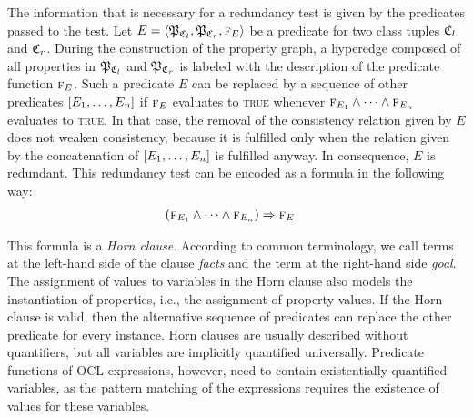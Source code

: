 The information that is necessary for a redundancy test is given by the predicates passed to the test.
Let $E = \tupled{\propertysettuple{P}{\classtuple{C}{l}}, \propertysettuple{P}{\classtuple{C}{r}}, \function{f}_E}$ be a predicate for two class tuples $\classtuple{C}{l}$ and $\classtuple{C}{r}$. 
During the construction of the property graph, a hyperedge composed of all properties in $\propertysettuple{P}{\classtuple{C}{l}}$ and $\propertysettuple{P}{\classtuple{C}{r}}$ is labeled with the description of the predicate function $\textsc{f}_E$.
Such a predicate $E$ can be replaced by a sequence of other predicates $[E_1, \dots, E_n]$ if $\textsc{f}_E$ evaluates to \textsc{true} whenever $\textsc{f}_{E_1} \wedge \dots \wedge \textsc{f}_{E_n}$ evaluates to \textsc{true}.
In that case, the removal of the consistency relation given by $E$ does not weaken consistency, because it is fulfilled only when  the relation given by the concatenation of $[E_1, \dots, E_n]$ is fulfilled anyway.
In consequence, $E$ is redundant.
This redundancy test can be encoded as a formula in the following way:
\begin{align*}
    &
    (\textsc{f}_{E_1} \wedge \dots \wedge \textsc{f}_{E_n}) \Rightarrow \textsc{f}_{E}
\end{align*}

This formula is a \emph{Horn clause}.
According to common terminology, we call terms at the left-hand side of the clause \textit{facts} and the term at the right-hand side \textit{goal}.
The assignment of values to variables in the Horn clause also models the instantiation of properties, i.e., the assignment of property values.
If the Horn clause is valid, then the alternative sequence of predicates can replace the other predicate for every instance.
Horn clauses are usually described without quantifiers, but all variables are implicitly quantified universally.
Predicate functions of \gls{OCL} expressions, however, need to contain existentially quantified \qvtr variables, as the pattern matching of the expressions requires the existence of values for these variables.



